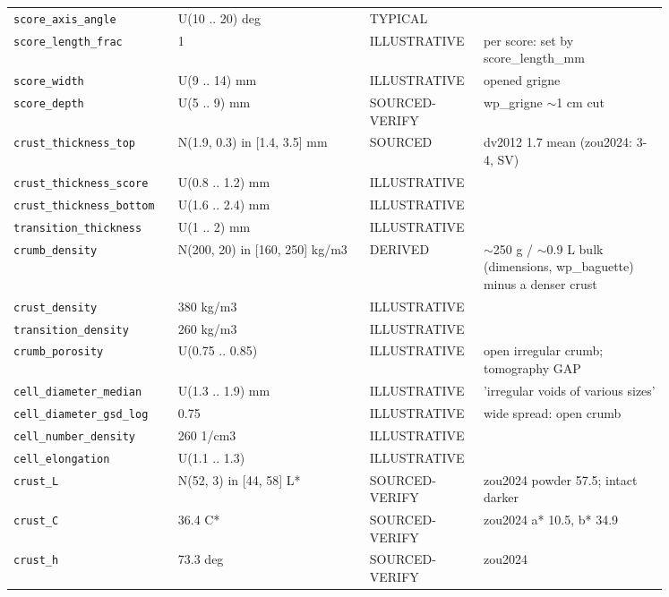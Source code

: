 \documentclass[10.5pt,a4paper]{article}
\begin{document}
{\begin{longtable}{@{}p{0.2\linewidth}p{0.27\linewidth}p{0.12\linewidth}p{0.26\linewidth}@{}}
\texttt{score\_\allowbreak{}axis\_\allowbreak{}angle} & U(10 .. 20) deg & TYPICAL &  \\
\texttt{score\_\allowbreak{}length\_\allowbreak{}frac} & 1 & ILLUSTRATIVE & per score: set by score\_length\_mm \\
\texttt{score\_\allowbreak{}width} & U(9 .. 14) mm & ILLUSTRATIVE & opened grigne \\
\texttt{score\_\allowbreak{}depth} & U(5 .. 9) mm & SOURCED-VERIFY & wp\_grigne $\sim$1 cm cut \\
\texttt{crust\_\allowbreak{}thickness\_\allowbreak{}top} & N(1.9, 0.3) in [1.4, 3.5] mm & SOURCED & dv2012 1.7 mean (zou2024: 3-4, SV) \\
\texttt{crust\_\allowbreak{}thickness\_\allowbreak{}score} & U(0.8 .. 1.2) mm & ILLUSTRATIVE &  \\
\texttt{crust\_\allowbreak{}thickness\_\allowbreak{}bottom} & U(1.6 .. 2.4) mm & ILLUSTRATIVE &  \\
\texttt{transition\_\allowbreak{}thickness} & U(1 .. 2) mm & ILLUSTRATIVE &  \\
\texttt{crumb\_\allowbreak{}density} & N(200, 20) in [160, 250] kg/m3 & DERIVED & $\sim$250 g / $\sim$0.9 L bulk (dimensions, wp\_baguette) minus a denser crust \\
\texttt{crust\_\allowbreak{}density} & 380 kg/m3 & ILLUSTRATIVE &  \\
\texttt{transition\_\allowbreak{}density} & 260 kg/m3 & ILLUSTRATIVE &  \\
\texttt{crumb\_\allowbreak{}porosity} & U(0.75 .. 0.85) & ILLUSTRATIVE & open irregular crumb; tomography GAP \\
\texttt{cell\_\allowbreak{}diameter\_\allowbreak{}median} & U(1.3 .. 1.9) mm & ILLUSTRATIVE & 'irregular voids of various sizes' \\
\texttt{cell\_\allowbreak{}diameter\_\allowbreak{}gsd\_\allowbreak{}log} & 0.75 & ILLUSTRATIVE & wide spread: open crumb \\
\texttt{cell\_\allowbreak{}number\_\allowbreak{}density} & 260 1/cm3 & ILLUSTRATIVE &  \\
\texttt{cell\_\allowbreak{}elongation} & U(1.1 .. 1.3) & ILLUSTRATIVE &  \\
\texttt{crust\_\allowbreak{}L} & N(52, 3) in [44, 58] L* & SOURCED-VERIFY & zou2024 powder 57.5; intact darker \\
\texttt{crust\_\allowbreak{}C} & 36.4 C* & SOURCED-VERIFY & zou2024 a* 10.5, b* 34.9 \\
\texttt{crust\_\allowbreak{}h} & 73.3 deg & SOURCED-VERIFY & zou2024 \\

\end{longtable}}
\end{document}
